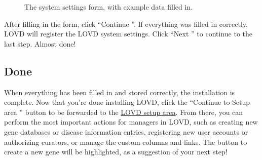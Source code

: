 \documentclass[a4paper,oneside,openany,12pt]{memoir}
\begin{document}
\begin{figure}[h]
  \begin{shaded}
  \caption{The system settings form, with example data filled in.}
  \end{shaded}
\end{figure}

After filling in the form, click ``Continue \guillemotright''.
If everything was filled in correctly, LOVD will register the LOVD system settings.
Click ``Next \guillemotright'' to continue to the last step.
Almost done!



\pagebreak[4] %
\subsection{Done}
When everything has been filled in and stored correctly, the installation is complete.
Now that you're done installing LOVD, click the ``Continue to Setup area \guillemotright'' button to be forwarded to the \hyperlink{c_setup}{LOVD setup area}.
From there, you can perform the most important actions for managers in LOVD, such as creating new gene databases or disease information entries, registering new user accounts or authorizing curators, or manage the custom columns and links.
The button to create a new gene will be highlighted, as a suggestion of your next step!
\clearpage %
\end{document}
